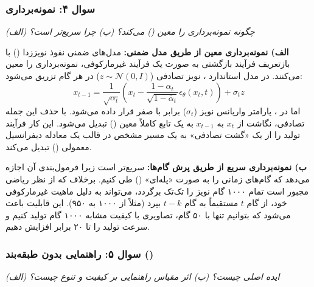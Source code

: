 \subsubsection{سوال ۴: نمونه‌برداری }
\textit{(الف)  چگونه نمونه‌برداری را معین () می‌کند؟ (ب) چرا سریع‌تر است؟}

\begin{solutionbox}
    \textbf{الف) نمونه‌برداری معین از طریق مدل ضمنی:}
    مدل‌های ضمنی نفوذ نویززدا () با بازتعریف فرآیند بازگشتی به صورت یک فرآیند غیرمارکوفی، نمونه‌برداری را معین می‌کنند. در مدل استاندارد ، نویز تصادفی ($z \sim \mathcal{N}(0, I)$) در هر گام تزریق می‌شود:
    \[ x_{t-1} = \frac{1}{\sqrt{\alpha_t}} \left( x_t - \frac{1-\alpha_t}{\sqrt{1-\bar{\alpha}_t}} \epsilon_\theta(x_t, t) \right) + \sigma_t z \]
    اما در ، پارامتر واریانس نویز ($\sigma_t$) برابر با صفر قرار داده می‌شود. با حذف این جمله تصادفی، نگاشت از $x_t$ به $x_{t-1}$ به یک تابع کاملاً معین () تبدیل می‌شود. این کار فرآیند تولید را از یک «گشت تصادفی» به یک مسیر مشخص در قالب یک معادله دیفرانسیل معمولی () تبدیل می‌کند.

    

    \textbf{ب) نمونه‌برداری سریع از طریق پرش گام‌ها:}
     سریع‌تر است زیرا فرمول‌بندی آن اجازه می‌دهد که گام‌های زمانی را به صورت «پله‌ای» () طی کنیم. برخلاف  که از نظر ریاضی مجبور است تمام ۱۰۰۰ گام نویز را تک‌تک برگردد،  می‌تواند به دلیل ماهیت غیرمارکوفی خود، از گام $t$ مستقیماً به گام $t-k$ بپرد (مثلاً از ۱۰۰۰ به ۹۵۰). این قابلیت باعث می‌شود که بتوانیم تنها با ۵۰ گام، تصاویری با کیفیت مشابه ۱۰۰۰ گام تولید کنیم و سرعت تولید را تا ۲۰ برابر افزایش دهیم.
\end{solutionbox}

\subsubsection{سوال ۵: راهنمایی بدون طبقه‌بند ()}
\textit{(الف) ایده اصلی  چیست؟ (ب) اثر مقیاس راهنمایی بر کیفیت و تنوع چیست؟}

